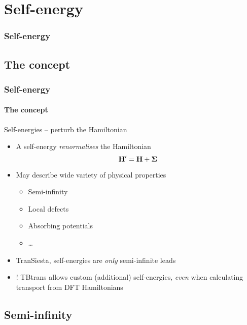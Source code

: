 \section{Self-energy}

\begin{framenologo}
  \frametitle{Self-energy}
  \tableofcontents[currentsection]
\end{framenologo}

\subsection{The concept}

\begin{frame}
  \frametitle{Self-energy}
  \framesubtitle{The concept}

  \begin{block}{Self-energies -- perturb the Hamiltonian}
    
    \begin{itemize}[<+->]
      \item A self-energy \emph{renormalises} the Hamiltonian
      \begin{equation*}
        \mathbf{H}' = \mathbf{H} + \boldsymbol{\Sigma}
      \end{equation*}
      \item May describe wide variety of physical properties
      \begin{itemize}[<.->]
        \item Semi-infinity
        \item Local defects
        \item Absorbing potentials
        \item \dots
      \end{itemize}
      \item TranSiesta, self-energies are \emph{only} semi-infinite leads

      \item ! TBtrans allows custom (additional) self-energies, \emph{even} when calculating
      transport from DFT Hamiltonians
    \end{itemize}

  \end{block}

\end{frame}

\subsection{Semi-infinity}


